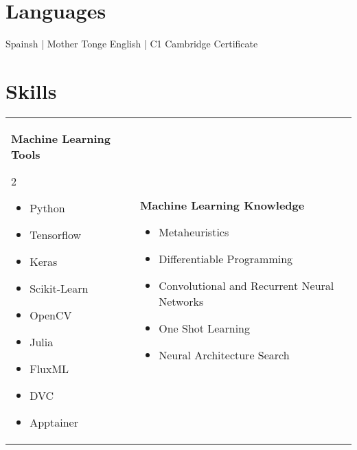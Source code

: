 \documentclass[12pt, letterpaper]{article}
\renewcommand{\large}{\fontsize{14}{20}\selectfont}
\begin{document}
	\section{Languages}
	\textcolor{accent-color}{Spainsh |} Mother Tonge \hspace{2.5em}
	\textcolor{accent-color}{English |} C1 Cambridge Certificate

	\section{Skills}
	\begin{tabular}[t]{ l l }
		\parbox[l]{0.5\linewidth}{
			{\large \color{base-color} \textbf{Machine Learning Tools}}
			\begin{multicols}{2}
			\begin{itemize}[leftmargin=*]
				\setlength\itemsep{0.05em}
				\item[] Python
				\item[] Tensorflow
				\item[] Keras
				\item[] Scikit-Learn
				\item[] OpenCV
				\item[] Julia
				\item[] FluxML
				\item[] DVC
				\item[] Apptainer
			\end{itemize}
			\end{multicols}
		}&
		\parbox{0.5\textwidth}{
			{\large \color{base-color} \textbf{Machine Learning Knowledge}}
			\begin{itemize}[leftmargin=*]
				\setlength\itemsep{0.05em}
				\item[] Metaheuristics
				\item[] Differentiable Programming
				\item[] Convolutional and Recurrent Neural Networks
				\item[] One Shot Learning
				\item[] Neural Architecture Search
			\end{itemize}
		}\medskip \\


\end{tabular}
\end{document}
